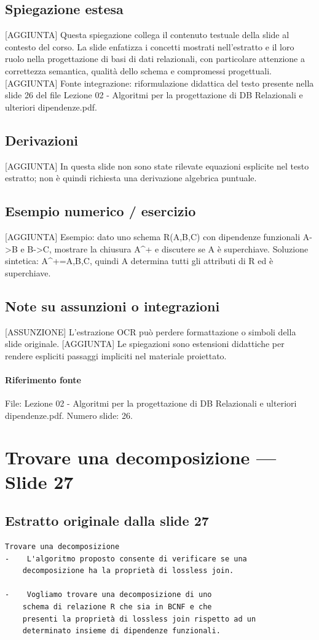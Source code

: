 \documentclass[11pt]{article}
\begin{document}
\subsection*{Spiegazione estesa}
[AGGIUNTA] Questa spiegazione collega il contenuto testuale della slide al contesto del corso. La slide enfatizza i concetti mostrati nell'estratto e il loro ruolo nella progettazione di basi di dati relazionali, con particolare attenzione a correttezza semantica, qualità dello schema e compromessi progettuali.
[AGGIUNTA] Fonte integrazione: riformulazione didattica del testo presente nella slide 26 del file Lezione 02 - Algoritmi per la progettazione di DB Relazionali e ulteriori dipendenze.pdf.
\subsection*{Derivazioni}
[AGGIUNTA] In questa slide non sono state rilevate equazioni esplicite nel testo estratto; non è quindi richiesta una derivazione algebrica puntuale.
\subsection*{Esempio numerico / esercizio}
[AGGIUNTA] Esempio: dato uno schema R(A,B,C) con dipendenze funzionali A->B e B->C, mostrare la chiusura A^+ e discutere se A è superchiave. Soluzione sintetica: A^+={A,B,C}, quindi A determina tutti gli attributi di R ed è superchiave.
\subsection*{Note su assunzioni o integrazioni}
[ASSUNZIONE] L'estrazione OCR può perdere formattazione o simboli della slide originale.
[AGGIUNTA] Le spiegazioni sono estensioni didattiche per rendere espliciti passaggi impliciti nel materiale proiettato.
\paragraph{Riferimento fonte} File: Lezione 02 - Algoritmi per la progettazione di DB Relazionali e ulteriori dipendenze.pdf. Numero slide: 26.
\section{Trovare una decomposizione --- Slide 27}
\subsection*{Estratto originale dalla slide 27}
\begin{lstlisting}
Trovare una decomposizione
-    L'algoritmo proposto consente di verificare se una
    decomposizione ha la proprietà di lossless join.

-    Vogliamo trovare una decomposizione di uno
    schema di relazione R che sia in BCNF e che
    presenti la proprietà di lossless join rispetto ad un
    determinato insieme di dipendenze funzionali.
\end{lstlisting}
\end{document}
